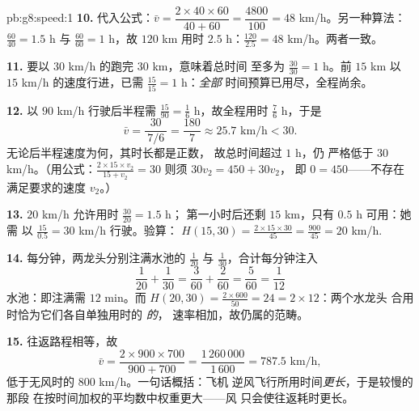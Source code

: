 \begin{solution}{pb:g8:speed:1}
\textbf{10.} 代入公式：$\bar v = \dfrac{2 \times 40 \times 60}
{40 + 60} = \dfrac{4800}{100} = 48$ km/h。另一种算法：
$\frac{60}{40} = 1.5$ h 与 $\frac{60}{60} = 1$ h，故 $120$ km 用时
$2.5$ h：$\frac{120}{2.5} = 48$ km/h。两者一致。

\textbf{11.} 要以 $30$ km/h 的跑完 $30$ km，意味着总时间
至多为 $\frac{30}{30} = 1$ h。前 $15$ km 以 $15$ km/h
的速度行进，已需 $\frac{15}{15} = 1$ h：\emph{全部}
时间预算已用尽，全程尚余。

\textbf{12.} 以 $90$ km/h 行驶后半程需
$\frac{15}{90} = \frac16$ h，故全程用时 $\frac76$ h，于是
\[
\bar v = \frac{30}{\ 7/6\ } = \frac{180}{7} \approx 25.7
\text{ km/h} < 30 .
\]
无论后半程速度为何，其时长都是正数，
故总时间超过 $1$ h，仍
严格低于 $30$ km/h。（用公式：$\frac{2 \times 15
\times v_2}{15 + v_2} = 30$ 则须 $30 v_2 = 450 + 30 v_2$，
即 $0 = 450$——不存在满足要求的速度 $v_2$。）

\textbf{13.}  $20$ km/h 允许用时 $\frac{30}{20} = 1.5$ h；
第一小时后还剩 $15$ km，只有 $0.5$ h 可用：她需
以 $\frac{15}{0.5} = 30$ km/h 行驶。验算：
$H(15, 30) = \frac{2 \times 15 \times 30}{45} = \frac{900}{45}
= 20$ km/h.

\textbf{14.} 每分钟，两龙头分别注满水池的 $\frac{1}{20}$ 与
$\frac{1}{30}$，合计每分钟注入
\[
\frac{1}{20} + \frac{1}{30}
= \frac{3}{60} + \frac{2}{60}
= \frac{5}{60} = \frac{1}{12}
\]
水池：即注满需 $12$ min。而
$H(20, 30) = \frac{2 \times 600}{50} = 24 = 2 \times 12$：两个水龙头
合用时恰为它们各自单独用时的 \emph{的}，
速率相加，故仍属的范畴。

\textbf{15.} 往返路程相等，故
\[
\bar v = \frac{2 \times 900 \times 700}{900 + 700}
= \frac{1\,260\,000}{1\,600} = 787.5 \text{ km/h},
\]
低于无风时的 $800$ km/h。一句话概括：飞机
逆风飞行所用时间\emph{更长}，于是较慢的那段
在按时间加权的平均数中权重更大——风
只会使往返耗时更长。
\end{solution}
